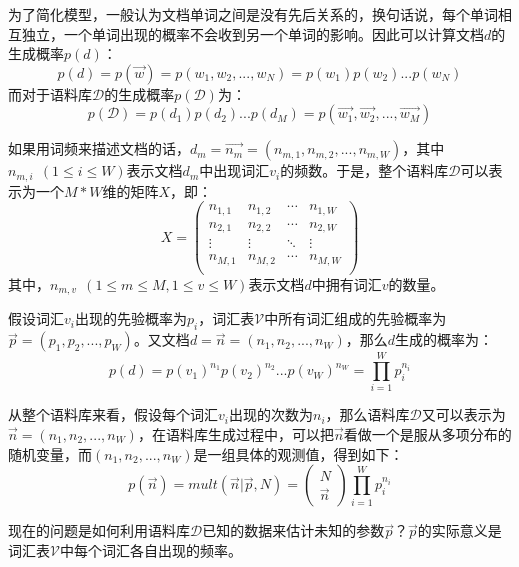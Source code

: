 为了简化模型，一般认为文档单词之间是没有先后关系的，换句话说，每个单词相互独立，一个单词出现的概率不会收到另一个单词的影响。因此可以计算文档$d$的生成概率$p(d)$：
\begin{equation}
  p(d)=p(\vec{w})=p(w_1,w_2,...,w_N)=p(w_1)p(w_2)...p(w_N)
\end{equation}
而对于语料库$\mathcal{D}$的生成概率$p(\mathcal{D})$为：
\begin{equation}
  p(\mathcal{D})=p(d_1)p(d_2)...p(d_M)=p(\vec{w_1},\vec{w_2},...,\vec{w_M})
\end{equation}

如果用词频来描述文档的话，$d_m=\vec{n_m}=(n_{m,1},n_{m,2},...,n_{m,W})$，其中$n_{m,i}~~(1\le i\le W)$表示文档$d_m$中出现词汇$v_i$的频数。于是，整个语料库$\mathcal{D}$可以表示为一个$M*W$维的矩阵$X$，即：
\begin{equation*}
  X=\left(
  \begin{array}{cccc}
    n_{1,1} & n_{1,2} & \cdots & n_{1,W} \\
    n_{2,1} & n_{2,2} & \cdots & n_{2,W} \\
    \vdots & \vdots & \ddots & \vdots \\ 
    n_{M,1} & n_{M,2} & \cdots & n_{M,W} \\
  \end{array}
  \right)
\end{equation*}
其中，$n_{m,v}~~(1\le m\le M,1\le v\le W)$表示文档$d$中拥有词汇$v$的数量。

假设词汇$v_i$出现的先验概率为$p_i$，词汇表$\mathcal{V}$中所有词汇组成的先验概率为$\vec{p}=(p_1,p_2,...,p_W)$。又文档$d=\vec{n}=(n_1,n_2,...,n_W)$，那么$d$生成的概率为：
\begin{equation}
  p(d)=p(v_1)^{n_1}p(v_2)^{n_2}...p(v_W)^{n_W}=\prod_{i=1}^{W}p_i^{n_i}
\end{equation}

从整个语料库来看，假设每个词汇$v_i$出现的次数为$n_i$，那么语料库$\mathcal{D}$又可以表示为$\vec{n}=(n_1,n_2,...,n_W)$，在语料库生成过程中，可以把$\vec{n}$看做一个是服从多项分布的随机变量，而$(n_1,n_2,...,n_W)$是一组具体的观测值，得到如下：
\begin{equation}
  \label{eq:vocmulti}
  p(\vec{n})=mult(\vec{n}|\vec{p},N)=
  \begin{pmatrix}
    N \\
    \vec{n}
  \end{pmatrix}
  \prod_{i=1}^Wp_i^{n_i}
\end{equation}

现在的问题是如何利用语料库$\mathcal{D}$已知的数据来估计未知的参数$\vec{p}$？$\vec{p}$的实际意义是词汇表$\mathcal{V}$中每个词汇各自出现的频率。

